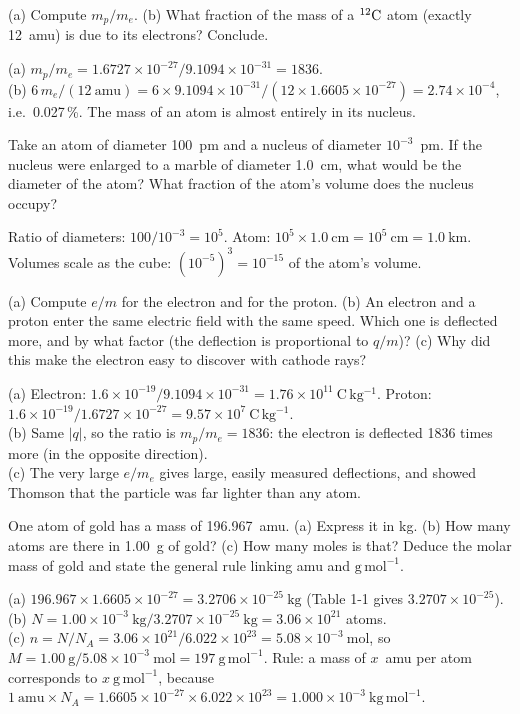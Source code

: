 (a) Compute $m_p/m_e$. (b) What fraction of the mass of a ${}^{12}\mathrm{C}$ atom (exactly 12~amu) is due to
its electrons? Conclude.
\begin{solution}
(a) $m_p/m_e = 1.6727\times10^{-27}/9.1094\times10^{-31} = 1836$.\\
(b) $6\,m_e / (12\ \mathrm{amu}) = 6\times9.1094\times10^{-31}/(12\times1.6605\times10^{-27})
= 2.74\times10^{-4}$, i.e.\ 0.027\,\%. The mass of an atom is almost entirely in its nucleus.
\end{solution}

Take an atom of diameter 100~pm and a nucleus of diameter $10^{-3}$~pm. If the nucleus were enlarged
to a marble of diameter 1.0~cm, what would be the diameter of the atom? What fraction of the atom's
volume does the nucleus occupy?
\begin{solution}
Ratio of diameters: $100/10^{-3} = 10^5$. Atom: $10^5\times1.0\ \mathrm{cm} = 10^5\ \mathrm{cm} =
1.0\ \mathrm{km}$. Volumes scale as the cube: $(10^{-5})^3 = 10^{-15}$ of the atom's volume.
\end{solution}

(a) Compute $e/m$ for the electron and for the proton. (b) An electron and a proton enter the same
electric field with the same speed. Which one is deflected more, and by what factor (the deflection is
proportional to $q/m$)? (c) Why did this make the electron easy to discover with cathode rays?
\begin{solution}
(a) Electron: $1.6\times10^{-19}/9.1094\times10^{-31} = 1.76\times10^{11}\ \mathrm{C\,kg^{-1}}$.
Proton: $1.6\times10^{-19}/1.6727\times10^{-27} = 9.57\times10^{7}\ \mathrm{C\,kg^{-1}}$.\\
(b) Same $|q|$, so the ratio is $m_p/m_e = 1836$: the electron is deflected 1836 times more (in the
opposite direction).\\
(c) The very large $e/m_e$ gives large, easily measured deflections, and showed Thomson that the
particle was far lighter than any atom.
\end{solution}

One atom of gold has a mass of 196.967~amu. (a) Express it in kg. (b) How many atoms are there in
1.00~g of gold? (c) How many moles is that? Deduce the molar mass of gold and state the general rule
linking amu and $\mathrm{g\,mol^{-1}}$.
\begin{solution}
(a) $196.967\times1.6605\times10^{-27} = 3.2706\times10^{-25}\ \mathrm{kg}$ (Table 1-1 gives
$3.2707\times10^{-25}$).\\
(b) $N = 1.00\times10^{-3}\ \mathrm{kg}/3.2707\times10^{-25}\ \mathrm{kg} = 3.06\times10^{21}$ atoms.\\
(c) $n = N/N_A = 3.06\times10^{21}/6.022\times10^{23} = 5.08\times10^{-3}\ \mathrm{mol}$, so
$M = 1.00\ \mathrm g/5.08\times10^{-3}\ \mathrm{mol} = 197\ \mathrm{g\,mol^{-1}}$.
Rule: a mass of $x$~amu per atom corresponds to $x\ \mathrm{g\,mol^{-1}}$, because
$1\ \mathrm{amu}\times N_A = 1.6605\times10^{-27}\times6.022\times10^{23} = 1.000\times10^{-3}\ \mathrm{kg\,mol^{-1}}$.
\end{solution}

